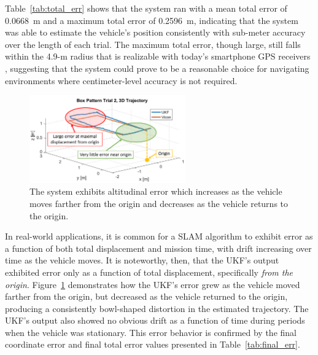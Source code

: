 Table~\ref{tab:total_err} shows that the system ran with a mean total error of 0.0668~m and a maximum total error of 0.2596~m, indicating that the system was able to estimate the vehicle's position consistently with sub-meter accuracy over the length of each trial. The maximum total error, though large, still falls within the 4.9-m radius that is realizable with today's smartphone GPS receivers \cite{GpsGov}, suggesting that the system could prove to be a reasonable choice for navigating environments where centimeter-level accuracy is not required.

\begin{figure}[h]
  \centering
    \includegraphics[width=0.6\textwidth]{box_error_diagram}
  \caption[Example of Box Pattern Error Behavior]{The system exhibits altitudinal error which increases as the vehicle moves farther from the origin and decreases as the vehicle returns to the origin.}
  \label{fig:box_error_diagram}
\end{figure}

In real-world applications, it is common for a SLAM algorithm to exhibit error as a function of both total displacement and mission time, with drift increasing over time as the vehicle moves. It is noteworthy, then, that the UKF's output exhibited error only as a function of total displacement, specifically \textit{from the origin}. Figure~\ref{fig:box_error_diagram} demonstrates how the UKF's error grew as the vehicle moved farther from the origin, but decreased as the vehicle returned to the origin, producing a consistently bowl-shaped distortion in the estimated trajectory. The UKF's output also showed no obvious drift as a function of time during periods when the vehicle was stationary. This error behavior is confirmed by the final coordinate error and final total error values presented in Table~\ref{tab:final_err}. 

